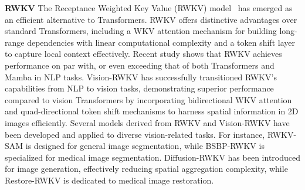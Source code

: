 \noindent\textbf{RWKV}
%
The Receptance Weighted Key Value (RWKV) model~\cite{Bo.rwkv.2023, Datta2024TheEO} has emerged as an efficient alternative to Transformers.
RWKV offers distinctive advantages over standard Transformers, including a WKV attention mechanism for building long-range dependencies with linear computational complexity and a token shift layer to capture local context effectively. 
%
Recent study\cite{Peng2024EagleAF} shows that RWKV achieves performance on par with, or even exceeding that of both Transformers and Mamba in NLP tasks.
Vision-RWKV\cite{Duan2024VisionRWKVEA} has successfully transitioned RWKV's capabilities from NLP to vision tasks, demonstrating superior performance compared to vision Transformers by incorporating bidirectional WKV attention and quad-directional token shift mechanisms to harness spatial information in 2D images efficiently.
Several models derived from RWKV and Vision-RWKV have been developed and applied to diverse vision-related tasks. For instance, RWKV-SAM\cite{Yuan2024MambaOR} is designed for general image segmentation, while BSBP-RWKV\cite{Zhou2024BSBPRWKVBS} is specialized for medical image segmentation. Diffusion-RWKV\cite{Fei2024DiffusionRWKVSR} has been introduced for image generation, effectively reducing spatial aggregation complexity, while Restore-RWKV\cite{Yang2024RestoreRWKVEA} is dedicated to medical image restoration.







